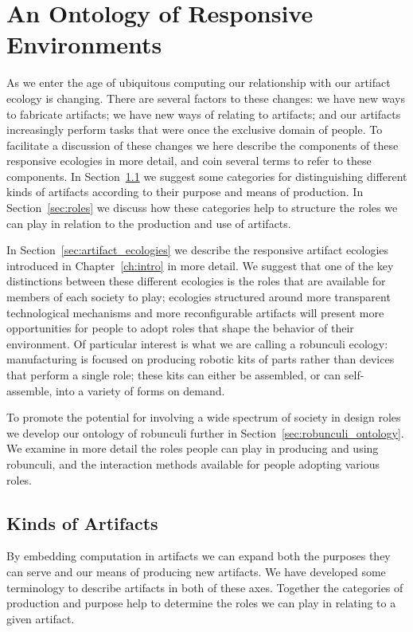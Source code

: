 \chapter{An Ontology of Responsive Environments}
\label{ch:ontology}
%
As we enter the age of ubiquitous computing our relationship with our artifact ecology is changing. 
There are several factors to these changes: we have new ways to fabricate artifacts; we have new ways of relating to artifacts; and our artifacts increasingly perform tasks that were once the exclusive domain of people.
To facilitate a discussion of these changes we here describe the components of these responsive ecologies in more detail, and coin several terms to refer to these components.
In Section~\ref{sec:kinds_of_artifacts} we suggest some categories for distinguishing different kinds of artifacts according to their purpose and means of production.
In Section~\ref{sec:roles} we discuss how these categories help to structure the roles we can play in relation to the production and use of artifacts.

In Section~\ref{sec:artifact_ecologies} we describe the responsive artifact ecologies introduced in Chapter~\ref{ch:intro} in more detail. 
We suggest that one of the key distinctions between these different ecologies is the roles that are available for members of each society to play; ecologies structured around more transparent technological mechanisms and more reconfigurable artifacts will present more opportunities for people to adopt roles that shape the behavior of their environment. 
Of particular interest is what we are calling a robunculi ecology: manufacturing is focused on producing robotic kits of parts rather than devices that perform a single role; these kits can either be assembled, or can self-assemble, into a variety of forms on demand. 

To promote the potential for involving a wide spectrum of society in design roles we develop our ontology of robunculi further in Section~\ref{sec:robunculi_ontology}. 
We examine in more detail the roles people can play in producing and using robunculi, and the interaction methods available for people adopting various roles.


\section{Kinds of Artifacts}
\label{sec:kinds_of_artifacts}
%
By embedding computation in artifacts we can expand both the purposes they can serve and our means of producing new artifacts. 
We have developed some terminology to describe artifacts in both of these axes. 
Together the categories of production and purpose help to determine the roles we can play in relating to a given artifact.

